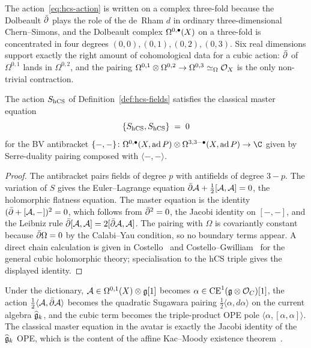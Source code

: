 \begin{remark}
\label{rem:six-real-dimensions}
The action~\eqref{eq:hcs-action} is written on a complex three-fold
because the Dolbeault $\bar\partial$ plays the role of the de~Rham $d$ in
ordinary three-dimensional Chern--Simons, and the Dolbeault complex
$\Omega^{0,\bullet}(X)$ on a three-fold is concentrated in four degrees
$(0,0),(0,1),(0,2),(0,3)$. Six real dimensions support exactly the
right amount of cohomological data for a cubic action: $\bar\partial$ of
$\Omega^{0,1}$ lands in $\Omega^{0,2}$, and the pairing
$\Omega^{0,1}\otimes\Omega^{0,2}\to\Omega^{0,3}\simeq_\Omega\mathcal{O}_X$ is
the only non-trivial contraction.
\end{remark}

\begin{proposition}
\label{prop:hcs-classical-master}
%
The action $S_{\mathrm{hCS}}$ of
Definition~\ref{def:hcs-fields} satisfies the classical
master equation
\begin{equation}
 \{S_{\mathrm{hCS}},S_{\mathrm{hCS}}\} \;=\; 0
\end{equation}
for the BV antibracket
$\{-,-\}\colon\Omegabar(X,\mathrm{ad}\,P)
\otimes\Omega^{3,3-\bullet}(X,\mathrm{ad}\,P)\to\C$
given by Serre-duality pairing composed with
$\langle-,-\rangle$.
\end{proposition}

\begin{proof}
The antibracket pairs fields of degree $p$ with antifields of degree
$3-p$. The variation of $S$ gives the Euler--Lagrange
equation $\bar\partial\mathcal{A}+\tfrac{1}{2}[\mathcal{A},\mathcal{A}]=0$, the holomorphic flatness
equation. The master equation is the identity
$(\bar\partial+[\mathcal{A},-])^2 = 0$, which follows from $\bar\partial^2=0$, the Jacobi
identity on $[-,-]$, and the Leibniz rule
$\bar\partial[\mathcal{A},\mathcal{A}] = 2[\bar\partial\mathcal{A},\mathcal{A}]$. The pairing with $\Omega$ is
covariantly constant because $\bar\partial\Omega = 0$ by the
Calabi--Yau condition, so no boundary terms appear. A direct chain
calculation is given in Costello~\cite[Ch.\,4]{CostelloRenormalization}
and Costello--Gwilliam~\cite[Ch.\,3,\,5.6]{CostelloGwilliam2017}
for the general cubic holomorphic theory; specialisation
to the hCS triple gives the displayed identity.
\end{proof}

\begin{remark}
\label{rem:chiral-avatar-classical}
Under the dictionary, $\mathcal{A}\in\Omega^{0,1}(X)\otimes\mathfrak{g}[1]$ becomes
$\alpha\in\mathrm{CE}^1(\mathfrak{g}\otimes\mathcal{O}_C)[1]$, the action
$\tfrac{1}{2}\langle\mathcal{A},\bar\partial\mathcal{A}\rangle$ becomes the quadratic
Sugawara pairing $\tfrac{1}{2}\langle\alpha,d\alpha\rangle$ on the
current algebra $\widehat{\mathfrak{g}}_k$, and the cubic term becomes the
triple-product OPE pole $\langle\alpha,[\alpha,\alpha]\rangle$. The
classical master equation in the avatar is exactly the Jacobi identity
of the $\widehat{\mathfrak{g}}_k$ OPE, which is the content of the affine
Kac--Moody existence theorem~\cite{KacInfDim}.
\end{remark}

